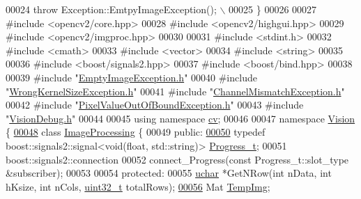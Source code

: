 \begin{DoxyCode}
00024 \textcolor{preprocessor}{    throw Exception::EmtpyImageException();                                    \(\backslash\)}
00025 \textcolor{preprocessor}{  \}}
00026 
00027 \textcolor{preprocessor}{#include <opencv2/core.hpp>}
00028 \textcolor{preprocessor}{#include <opencv2/highgui.hpp>}
00029 \textcolor{preprocessor}{#include <opencv2/imgproc.hpp>}
00030 
00031 \textcolor{preprocessor}{#include <stdint.h>}
00032 \textcolor{preprocessor}{#include <cmath>}
00033 \textcolor{preprocessor}{#include <vector>}
00034 \textcolor{preprocessor}{#include <string>}
00035 
00036 \textcolor{preprocessor}{#include <boost/signals2.hpp>}
00037 \textcolor{preprocessor}{#include <boost/bind.hpp>}
00038 
00039 \textcolor{preprocessor}{#include "\hyperlink{_empty_image_exception_8h}{EmptyImageException.h}"}
00040 \textcolor{preprocessor}{#include "\hyperlink{_wrong_kernel_size_exception_8h}{WrongKernelSizeException.h}"}
00041 \textcolor{preprocessor}{#include "\hyperlink{_channel_mismatch_exception_8h}{ChannelMismatchException.h}"}
00042 \textcolor{preprocessor}{#include "\hyperlink{_pixel_value_out_of_bound_exception_8h}{PixelValueOutOfBoundException.h}"}
00043 \textcolor{preprocessor}{#include "\hyperlink{_vision_debug_8h}{VisionDebug.h}"}
00044 
00045 \textcolor{keyword}{using namespace }\hyperlink{namespacecv}{cv};
00046 
00047 \textcolor{keyword}{namespace }\hyperlink{namespace_vision}{Vision} \{
\hypertarget{_image_processing_8h_source_l00048}{}\hyperlink{class_vision_1_1_image_processing}{00048} \textcolor{keyword}{class }\hyperlink{class_vision_1_1_image_processing}{ImageProcessing} \{
00049 \textcolor{keyword}{public}:
\hypertarget{_image_processing_8h_source_l00050}{}\hyperlink{class_vision_1_1_image_processing_ade0de8f6751f8d19b8fbb9533a009d3c}{00050}   \textcolor{keyword}{typedef} boost::signals2::signal<void(float, std::string)> \hyperlink{class_vision_1_1_image_processing_ade0de8f6751f8d19b8fbb9533a009d3c}{Progress\_t};
00051   boost::signals2::connection
00052   connect\_Progress(\textcolor{keyword}{const} Progress\_t::slot\_type &subscriber);
00053 
00054 \textcolor{keyword}{protected}:
00055   \hyperlink{_soil_math_types_8h_a65f85814a8290f9797005d3b28e7e5fc}{uchar} *GetNRow(\textcolor{keywordtype}{int} nData, \textcolor{keywordtype}{int} hKsize, \textcolor{keywordtype}{int} nCols, \hyperlink{_soil_math_types_8h_a435d1572bf3f880d55459d9805097f62}{uint32\_t} totalRows);
\hypertarget{_image_processing_8h_source_l00056}{}\hyperlink{class_vision_1_1_image_processing_a5371ad8d6f7aac9d43ee5c902ade7435}{00056}   Mat \hyperlink{class_vision_1_1_image_processing_a5371ad8d6f7aac9d43ee5c902ade7435}{TempImg};

\end{DoxyCode}

